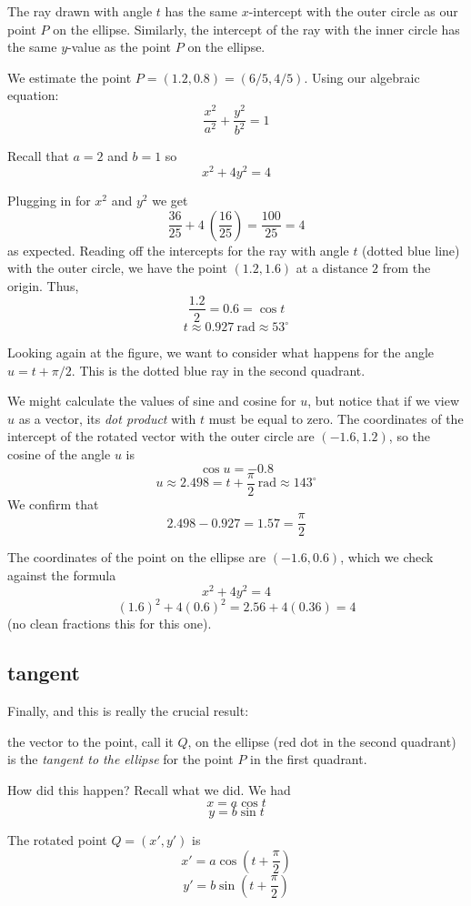 \documentclass[11pt, oneside]{article}
\begin{document}
The ray drawn with angle $t$ has the same $x$-intercept with the outer circle as our point $P$ on the ellipse.  Similarly, the intercept of the ray with the inner circle has the same $y$-value as the point $P$ on the ellipse.

We estimate the point $P=(1.2,0.8)=(6/5,4/5)$.  Using our algebraic equation:
\[ \frac{x^2}{a^2} + \frac{y^2}{b^2} = 1 \]

Recall that $a=2$ and $b=1$ so
\[ x^2 + 4y^2 = 4 \]

Plugging in for $x^2$ and $y^2$ we get
\[ \frac{36}{25} + 4 \ (\frac{16}{25}) = \frac{100}{25} = 4 \]
as expected.  Reading off the intercepts for the ray with angle $t$ (dotted blue line) with the outer circle, we have the point $(1.2,1.6)$ at a distance $2$ from the origin.  Thus,
\[ \frac{1.2}{2} = 0.6 = \cos t \]
\[ t \approx 0.927\ \text{rad} \approx 53^{\circ} \]

Looking again at the figure, we want to consider what happens for the angle $u = t + \pi/2$.  This is the dotted blue ray in the second quadrant.

We might calculate the values of sine and cosine for $u$, but notice that if we view $u$ as a vector, its \emph{dot product} with $t$ must be equal to zero.  The coordinates of the intercept of the rotated vector with the outer circle are $(-1.6,1.2)$, so the cosine of the angle $u$ is
\[ \cos u = -0.8 \]
\[ u \approx 2.498 = t + \frac{\pi}{2} \ \text{rad} \approx 143^{\circ} \]
We confirm that 
\[ 2.498 - 0.927 = 1.57 = \frac{\pi}{2} \]

The coordinates of the point on the ellipse are $(-1.6,0.6)$, which we check against the formula
\[ x^2 + 4y^2 = 4 \]
\[ (1.6)^2 + 4(0.6)^2 = 2.56 + 4(0.36) = 4 \]
(no clean fractions this for this one).

\subsection*{tangent}
Finally, and this is really the crucial result:

the vector to the point, call it $Q$, on the ellipse (red dot in the second quadrant) is the \emph{tangent to the ellipse} for the point $P$ in the first quadrant.

How did this happen?  Recall what we did.  We had 
\[ x = a \cos t \]
\[ y = b \sin t \]

The rotated point $Q = (x',y')$ is
\[ x' = a \cos (t + \frac{\pi}{2}) \]
\[ y' = b \sin (t + \frac{\pi}{2}) \]
\end{document}
